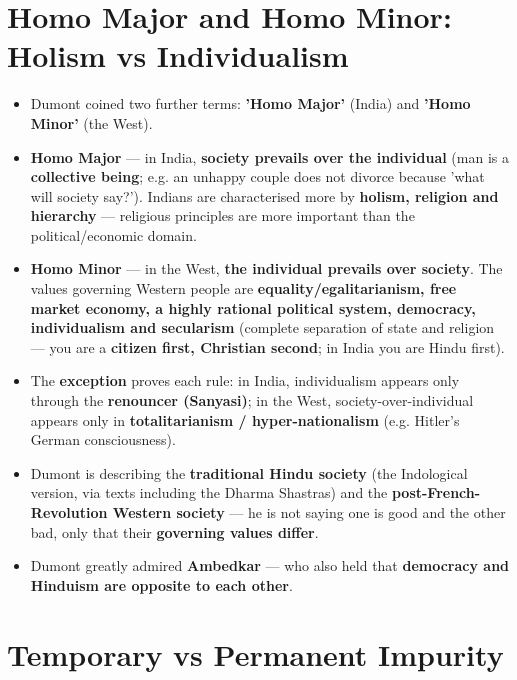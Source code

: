\section{Homo Major and Homo Minor: Holism vs Individualism}

\begin{KeyConcept}
\begin{itemize}
\item Dumont coined two further terms: \textbf{'Homo Major'} (India) and \textbf{'Homo Minor'} (the West).
\item \textbf{Homo Major} --- in India, \textbf{society prevails over the individual} (man is a \textbf{collective being}; e.g. an unhappy couple does not divorce because 'what will society say?'). Indians are characterised more by \textbf{holism, religion and hierarchy} --- religious principles are more important than the political/economic domain.
\item \textbf{Homo Minor} --- in the West, \textbf{the individual prevails over society}. The values governing Western people are \textbf{equality/egalitarianism, free market economy, a highly rational political system, democracy, individualism and secularism} (complete separation of state and religion --- you are a \textbf{citizen first, Christian second}; in India you are Hindu first).
\item The \textbf{exception} proves each rule: in India, individualism appears only through the \textbf{renouncer (Sanyasi)}; in the West, society-over-individual appears only in \textbf{totalitarianism / hyper-nationalism} (e.g. Hitler's German consciousness).
\end{itemize}
\end{KeyConcept}

\begin{KeyConcept}
\begin{itemize}
\item Dumont is describing the \textbf{traditional Hindu society} (the Indological version, via texts including the Dharma Shastras) and the \textbf{post-French-Revolution Western society} --- he is not saying one is good and the other bad, only that their \textbf{governing values differ}.
\item Dumont greatly admired \textbf{Ambedkar} --- who also held that \textbf{democracy and Hinduism are opposite to each other}.
\end{itemize}
\end{KeyConcept}

\section{Temporary vs Permanent Impurity}

